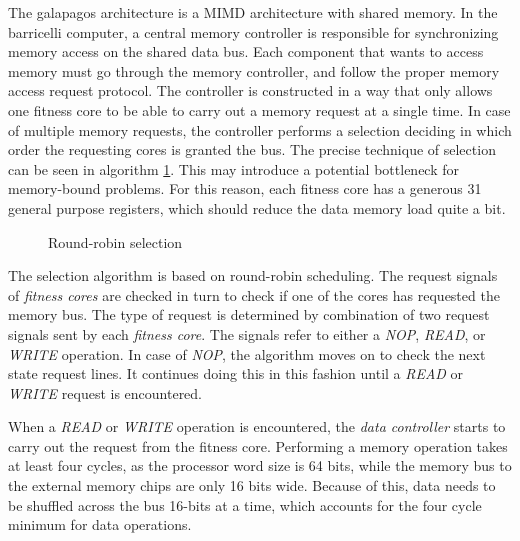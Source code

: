 The \gls{galapagos} architecture is a \gls{MIMD} architecture with shared memory.
In the \Gls{barricelli} computer, a central memory controller is responsible for synchronizing memory access on the shared data bus.
Each component that wants to access memory must go through the memory controller, and follow the proper memory access request protocol.
The controller is constructed in a way that only allows one fitness core to be able to carry out a memory request at a single time.
In case of multiple memory requests, the controller performs a selection deciding in which order the requesting cores is granted the bus.
The precise technique of selection can be seen in algorithm \ref{algorithm:round-robin-selection}.
This may introduce a potential bottleneck for memory-bound problems.
For this reason, each fitness core has a generous 31 general purpose registers, which should reduce the data memory load quite a bit.

\begin{figure}[H]
\begin{algorithm}[H]
\SetAlgoLined
\DontPrintSemicolon
{}
\caption{Round-robin selection}
\label{algorithm:round-robin-selection}
\end{algorithm}
\end{figure}


The selection algorithm is based on round-robin scheduling.
The request signals of \emph{fitness cores} are checked in turn to check if one of the cores has requested the memory bus.
The type of request is determined by combination of two request signals sent by each \emph{fitness core}.
The signals refer to either a \emph{NOP}, \emph{READ}, or \emph{WRITE} operation.
In case of \emph{NOP}, the algorithm moves on to check the next state request lines.
It continues doing this in this fashion until a \emph{READ} or \emph{WRITE} request is encountered. 

When a \emph{READ} or \emph{WRITE} operation is encountered, the \emph{data controller} starts to carry out the request from the fitness core.
Performing a memory operation takes at least four cycles, as the processor word size is 64 bits, while the memory bus to the external memory chips are only 16 bits wide.
Because of this, data needs to be shuffled across the bus 16-bits at a time, which accounts for the four cycle minimum for data operations.

